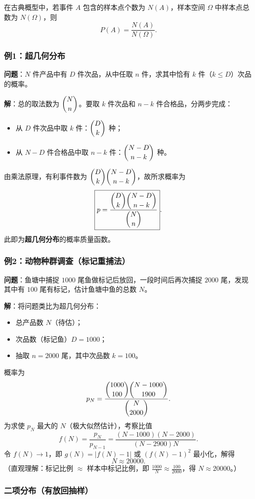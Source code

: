 \documentclass[11pt,a4paper]{report}
\theoremstyle{definition}
\begin{document}
在古典概型中，若事件 $A$ 包含的样本点个数为 $N(A)$，样本空间 $\Omega$ 中样本点总数为 $N(\Omega)$，则
\[
\boxed{P(A) = \frac{N(A)}{N(\Omega)}}.
\]

\subsubsection{例1：超几何分布}

\textbf{问题}：$N$ 件产品中有 $D$ 件次品，从中任取 $n$ 件，求其中恰有 $k$ 件（$k \leq D$）次品的概率。

\textbf{解}：总的取法数为 $\dbinom{N}{n}$。要取 $k$ 件次品和 $n-k$ 件合格品，分两步完成：
\begin{itemize}[leftmargin=2em]
    \item 从 $D$ 件次品中取 $k$ 件：$\dbinom{D}{k}$ 种；
    \item 从 $N-D$ 件合格品中取 $n-k$ 件：$\dbinom{N-D}{n-k}$ 种。
\end{itemize}
由乘法原理，有利事件数为 $\dbinom{D}{k}\dbinom{N-D}{n-k}$，故所求概率为
\[
\boxed{p = \frac{\dbinom{D}{k}\dbinom{N-D}{n-k}}{\dbinom{N}{n}}}.
\]
此即为\textbf{超几何分布}的概率质量函数。

\subsubsection{例2：动物种群调查（标记重捕法）}

\textbf{问题}：鱼塘中捕捉 $1000$ 尾鱼做标记后放回，一段时间后再次捕捉 $2000$ 尾，发现其中有 $100$ 尾有标记，估计鱼塘中鱼的总数 $N$。

\textbf{解}：将问题类比为超几何分布：
\begin{itemize}[leftmargin=2em]
    \item 总产品数 $N$（待估）；
    \item 次品数（标记鱼）$D = 1000$；
    \item 抽取 $n = 2000$ 尾，其中次品数 $k = 100$。
\end{itemize}
概率为
\[
p_N = \frac{\dbinom{1000}{100}\dbinom{N-1000}{1900}}{\dbinom{N}{2000}}.
\]
为求使 $p_N$ 最大的 $N$（极大似然估计），考察比值
\[
f(N) = \frac{p_N}{p_{N-1}} = \frac{(N-1000)(N-2000)}{(N-2900)N}.
\]
令 $f(N) \to 1$，即 $g(N) = |f(N)-1|$ 或 $(f(N)-1)^2$ 最小化，解得
\[
\boxed{N \approx 20000}.
\]
（直观理解：标记比例 $\approx$ 样本中标记比例，即 $\frac{1000}{N} \approx \frac{100}{2000}$，得 $N \approx 20000$。）

\subsubsection{二项分布（有放回抽样）}
\end{document}
